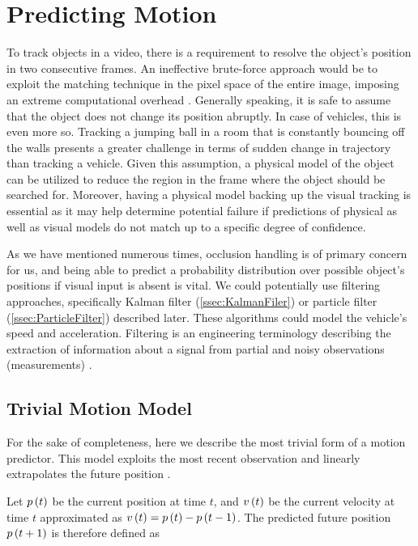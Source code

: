 \section{Predicting Motion}
\label{sec:PredictingMotion}

To track objects in a video, there is a requirement to resolve the object's position in two consecutive frames. An ineffective brute-force approach would be to exploit the matching technique in the pixel space of the entire image, imposing an extreme computational overhead \cite{Jalal2012}. Generally speaking, it is safe to assume that the object does not change its position abruptly. In case of vehicles, this is even more so. Tracking a jumping ball in a room that is constantly bouncing off the walls presents a greater challenge in terms of sudden change in trajectory than tracking a vehicle. Given this assumption, a physical model of the object can be utilized to reduce the region in the frame where the object should be searched for. Moreover, having a physical model backing up the visual tracking is essential as it may help determine potential failure if predictions of physical as well as visual models do not match up to a specific degree of confidence.

As we have mentioned numerous times, occlusion handling is of primary concern for us, and being able to predict a probability distribution over possible object's positions if visual input is absent is vital. We could potentially use filtering approaches, specifically Kalman filter (\cref{ssec:KalmanFiler}) or particle filter (\cref{ssec:ParticleFilter}) described later. These algorithms could model the vehicle's speed and acceleration. Filtering is an engineering terminology describing the extraction of information about a signal from partial and noisy observations (measurements) \cite{Kunsch2013}.

\subsection{Trivial Motion Model}
\label{ssec:TrivialMotionModel}

For the sake of completeness, here we describe the most trivial form of a motion predictor. This model exploits the most recent observation and linearly extrapolates the future position \cite{broida1986estimation}.

Let ${p} \left( t \right)$ be the current position at time $t$, and ${v} \left( t \right)$ be the current velocity at time $t$ approximated as ${v} \left( t \right) = {p} \left( t \right) - {p} \left( t - 1 \right)$. The predicted future position ${p} \left( t + 1 \right)$ is therefore defined as

